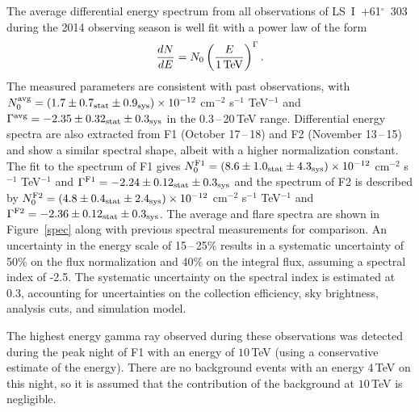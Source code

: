 \documentclass[preprint2]{aastex}
\newcommand{\tapp}{\raisebox{0.5ex}{\texttildelow}}
\newcommand{\pflux}{~photons cm$^{-2}$ s$^{-1}$}
\newcommand{\lsi}{LS~I~+61$^{\circ}$~303}
\newcommand{\tev}{\,TeV}
\begin{document}

The average differential energy spectrum from all observations of \lsi{} during the 2014 observing season is well fit with a power law of the form
\begin{equation}
\frac{dN}{dE} = N_0 \left( \frac{E}{1\mbox{\tev{}}} \right)^{\Gamma}.
\end{equation}
The measured parameters are consistent with past observations, with $N_0^{\mbox{\scriptsize avg}} = \left( 1.7 \pm 0.7_{\mathrm{stat}} \pm 0.9_{\mathrm{sys}} \right) \times 10^{-12}$ cm$^{-2}$ s$^{-1}$ TeV$^{-1}$ and $\Gamma^{\mbox{\scriptsize avg}} = -2.35 \pm 0.32_{\mathrm{stat}} \pm 0.3_{\mathrm{sys}}$ in the 0.3\,--\,20\tev{} range. Differential energy spectra are also extracted from F1 (October 17\,--\,18)  and F2 (November 13\,--\,15) and show a similar spectral shape, albeit with a higher normalization constant. The fit to the spectrum of F1 gives $N_0^{\mbox{\scriptsize F1}} = \left( 8.6 \pm 1.0_{\mathrm{stat}} \pm 4.3_{\mathrm{sys}} \right) \times 10^{-12}$ cm$^{-2}$ s$^{-1}$ TeV$^{-1}$ and $\Gamma^{\mbox{\scriptsize F1}} = -2.24 \pm 0.12_{\mathrm{stat}} \pm 0.3_{\mathrm{sys}}$  and the spectrum of F2 is described by $N_0^{\mbox{\scriptsize F2}} = \left( 4.8 \pm 0.4_{\mathrm{stat}} \pm 2.4_{\mathrm{sys}} \right) \times 10^{-12}$ cm$^{-2}$ s$^{-1}$ TeV$^{-1}$ and $\Gamma^{\mbox{\scriptsize F2}} = -2.36 \pm 0.12_{\mathrm{stat}} \pm 0.3_{\mathrm{sys}}$. The average and flare spectra are shown in Figure~\ref{spec} along with previous spectral measurements for comparison. An uncertainty in the energy scale of 15\,--\,25\% results in a systematic uncertainty of \tapp{}50\% on the flux normalization and \tapp{}40\% on the integral flux, assuming a spectral index of -2.5. The systematic uncertainty on the spectral index is estimated at \tapp{}0.3, accounting for uncertainties on the collection efficiency, sky brightness, analysis cuts, and simulation model.

The highest energy gamma ray observed during these observations was detected during the peak night of F1 with an energy of \tapp{}$10$\tev{} (using a conservative estimate of the energy). There are no background events with an energy 4\tev{} on this night, so it is assumed that the contribution of the background at \tapp{}$10$\tev{} is negligible.
\end{document}
